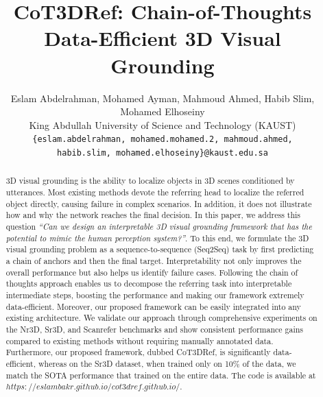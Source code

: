\documentclass{article} %
\author{
Eslam Abdelrahman, 
Mohamed Ayman,
Mahmoud Ahmed,
Habib Slim, 
Mohamed Elhoseiny \\
\hspace{0.1cm}
King Abdullah University of Science and Technology (KAUST) \hspace{0.1cm} \\
\texttt{\{eslam.abdelrahman, mohamed.mohamed.2, mahmoud.ahmed,} \\
\texttt{habib.slim, mohamed.elhoseiny\}@kaust.edu.sa} \\
}
\begin{document}
\newcommand{\papername}{Chain-of-Thoughts Data-Efficient 3D Visual Grounding}
\newcommand{\papernameAbbrev}{CoT3DRef}
\newcommand{\eslam}[1]{\textcolor{blue}{Eslam:\ #1}}
\newcommand{\mahmoud}[1]{~\textcolor{pink}{Mahmoud:\ #1}}
\newcommand{\ayman}[1]{~\textcolor{red}{Ayman:\ #1}}
\newcommand{\habib}[1]{~\textcolor{orange}{Habib:\ #1}}
\newcommand{\elhoseiny}[1]{~\textcolor{cyan}{elhoseiny:\ #1}}

\title{{\papernameAbbrev}: {\papername}}
\maketitle

\vspace{-5mm}
\begin{abstract}
  3D visual grounding is the ability to localize objects in 3D scenes conditioned by utterances.
  Most existing methods devote the referring head to localize the referred object directly, causing failure in complex scenarios.
In addition, it does not illustrate how and why the network reaches the final decision.
  In this paper, we address this question
  \emph{``Can we design an interpretable 3D visual grounding framework that has the potential to mimic the human perception system?''}.
  To this end, we formulate the 3D visual grounding problem as a sequence-to-sequence (Seq2Seq) task by first predicting a chain of anchors and then the final target.
  Interpretability not only improves the overall performance but also helps us identify failure cases.
  Following the chain of thoughts approach enables us to decompose the referring task into interpretable intermediate steps, boosting the performance and making our framework extremely data-efficient.
  Moreover, our proposed framework can be easily integrated into any existing architecture.
  We validate our approach through comprehensive experiments on the Nr3D, Sr3D, and Scanrefer benchmarks and show consistent performance gains compared to existing methods without requiring manually annotated data.
  Furthermore, our proposed framework, dubbed {\papernameAbbrev}, is significantly data-efficient, whereas on the Sr3D dataset, when trained only on 10\% of the data, we match the SOTA performance that trained on the entire data.
  The code is available at \href{https://eslambakr.github.io/cot3dref.github.io/}{$https://eslambakr.github.io/cot3dref.github.io/$}.
\end{abstract}
\end{document}

